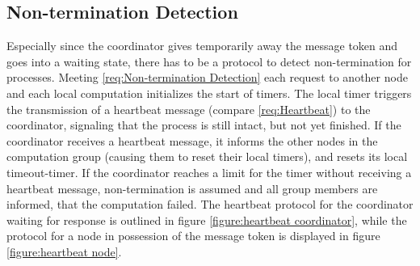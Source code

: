 \subsection{Non-termination Detection} \label{Non-termination Detection}

Especially since the coordinator gives temporarily away the message token and goes into a waiting state, there has to be a protocol to detect non-termination for processes. Meeting \ref{req:Non-termination Detection} each request to another node and each local computation initializes the start of timers. The local timer triggers the transmission of a heartbeat message (compare \ref{req:Heartbeat}) to the coordinator, signaling that the process is still intact, but not yet finished. If the coordinator receives a heartbeat message, it informs the other nodes in the computation group (causing them to reset their local timers), and resets its local timeout-timer. If the coordinator reaches a limit for the timer without receiving a heartbeat message, non-termination is assumed and all group members are informed, that the computation failed. The heartbeat protocol for the coordinator waiting for response is outlined in figure \ref{figure:heartbeat coordinator}, while the protocol for a node in possession of the message token is displayed in figure \ref{figure:heartbeat node}.  

